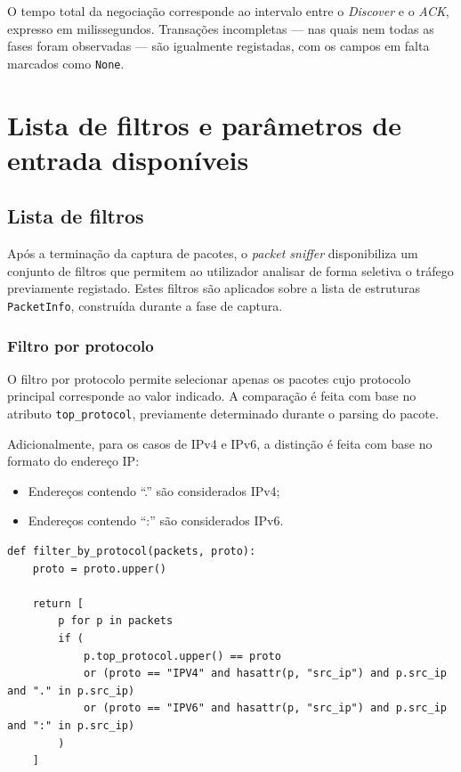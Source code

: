 \documentclass[a4paper,12pt]{article}
\begin{document}
O tempo total da negociação corresponde ao intervalo entre o \textit{Discover} e o
\textit{ACK}, expresso em milissegundos. Transações incompletas — nas quais nem todas
as fases foram observadas — são igualmente registadas, com os campos em falta marcados
como \texttt{None}.





\section{Lista de filtros e parâmetros de entrada disponíveis}

\subsection{Lista de filtros}

Após a terminação da captura de pacotes, o \textit{packet sniffer} disponibiliza um conjunto de filtros que permitem ao utilizador analisar de forma seletiva o tráfego previamente registado. Estes filtros são aplicados sobre a lista de estruturas \texttt{PacketInfo}, construída durante a fase de captura.

\subsubsection{Filtro por protocolo}

O filtro por protocolo permite selecionar apenas os pacotes cujo protocolo principal corresponde ao valor indicado. A comparação é feita com base no atributo \texttt{top\_protocol}, previamente determinado durante o parsing do pacote.

Adicionalmente, para os casos de IPv4 e IPv6, a distinção é feita com base no formato do endereço IP:

\begin{itemize}
    \item Endereços contendo ``.'' são considerados IPv4;
    \item Endereços contendo ``:'' são considerados IPv6.
\end{itemize}

\vspace{0.5em}

\begin{lstlisting}[style=python]
def filter_by_protocol(packets, proto):
    proto = proto.upper()

    return [
        p for p in packets
        if (
            p.top_protocol.upper() == proto
            or (proto == "IPV4" and hasattr(p, "src_ip") and p.src_ip and "." in p.src_ip)
            or (proto == "IPV6" and hasattr(p, "src_ip") and p.src_ip and ":" in p.src_ip)
        )
    ]
\end{lstlisting}
\end{document}
